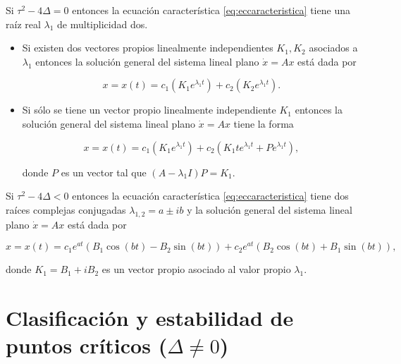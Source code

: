 \begin{theorem}Si $\tau^2 - 4\Delta = 0$ entonces la ecuación característica \ref{eq:eccaracteristica} tiene una raíz real $\lambda_1$ de multiplicidad dos.

\begin{itemize}

\item Si existen dos vectores propios linealmente independientes $K_1, K_2$ asociados a $\lambda_1$ entonces la solución general del sistema lineal plano $\dot{x} = Ax$ está dada por

\begin{equation} \label{eq:solvlrspropiosrepetidos1}
x = x(t) = c_1(K_1 e^{\lambda_1 t}) + c_2(K_2 e^{\lambda_1 t}).
\end{equation}

\item Si sólo se tiene un vector propio linealmente independiente $K_1$ entonces la solución general del sistema lineal plano $\dot{x} = Ax$ tiene la forma

\begin{equation} \label{eq:solvlrspropiosrepetidos2}
x = x(t) = c_1(K_1 e^{\lambda_1 t}) + c_2(K_1 t e^{\lambda_1 t} + Pe^{\lambda_1 t}),
\end{equation}

donde $P$ es un vector tal que $(A-\lambda_1I)P=K_1$.
\end{itemize}

\end{theorem}


\begin{theorem}Si $\tau^2 - 4\Delta < 0$ entonces la ecuación característica \ref{eq:eccaracteristica} tiene dos raíces complejas conjugadas $\lambda_{1,2} = a \pm i b$ y la solución general del sistema lineal plano $\dot{x} = Ax$ está dada por

\begin{equation} \label{eq:solvlrspropioscomplejos}
x = x(t) = c_1 e^{a t}(B_1 \cos(bt) - B_2 \sin(bt)) + c_2 e^{a t}(B_2 \cos(bt) + B_1 \sin(bt)),
\end{equation}

donde $K_1 = B_1 + iB_2$ es un vector propio asociado al valor propio $\lambda_1$.
\end{theorem}

\section{Clasificación y estabilidad de puntos críticos ($\Delta \neq 0$)} \label{sec:estabilidadlineal}

